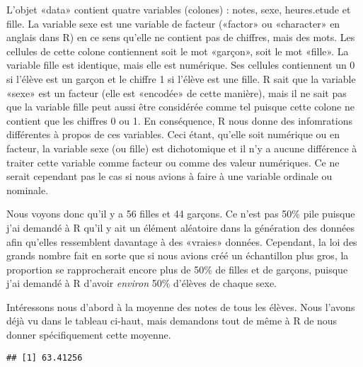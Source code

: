 \documentclass[
]{book}
\newenvironment{Shaded}{\begin{snugshade}}{\end{snugshade}}
\newcommand{\CommentTok}[1]{\textcolor[rgb]{0.56,0.35,0.01}{\textit{#1}}}
\newcommand{\FunctionTok}[1]{\textcolor[rgb]{0.00,0.00,0.00}{#1}}
\newcommand{\NormalTok}[1]{#1}
\newcommand{\SpecialCharTok}[1]{\textcolor[rgb]{0.00,0.00,0.00}{#1}}
\begin{document}
L'objet «data» contient quatre variables (colones) : notes, sexe, heures.etude et fille. La variable sexe est une variable de facteur («factor» ou «character» en anglais dans R) en ce sens qu'elle ne contient pas de chiffres, mais des mots. Les cellules de cette colone contiennent soit le mot «garçon», soit le mot «fille». La variable fille est identique, mais elle est numérique. Ses cellules contiennent un 0 si l'élève est un garçon et le chiffre 1 si l'élève est une fille. R sait que la variable «sexe» est un facteur (elle est «encodée» de cette manière), mais il ne sait pas que la variable fille peut aussi être considérée comme tel puisque cette colone ne contient que les chiffres 0 ou 1. En conséquence, R nous donne des infomrations différentes à propos de ces variables. Ceci étant, qu'elle soit numérique ou en facteur, la variable sexe (ou fille) est dichotomique et il n'y a aucune différence à traiter cette variable comme facteur ou comme des valeur numériques. Ce ne serait cependant pas le cas si nous avions à faire à une variable ordinale ou nominale.

Nous voyons donc qu'il y a 56 filles et 44 garçons. Ce n'est pas 50\% pile puisque j'ai demandé à R qu'il y ait un élément aléatoire dans la génération des données afin qu'elles ressemblent davantage à des «vraies» données. Cependant, la loi des grands nombre fait en sorte que si nous avions créé un échantillon plus gros, la proportion se rapprocherait encore plus de 50\% de filles et de garçons, puisque j'ai demandé à R d'avoir \emph{environ} 50\% d'élèves de chaque sexe.

Intéressons nous d'abord à la moyenne des notes de tous les élèves. Nous l'avons déjà vu dans le tableau ci-haut, mais demandons tout de même à R de nous donner spécifiquement cette moyenne.

\begin{Shaded}
\end{Shaded}

\begin{verbatim}
## [1] 63.41256
\end{verbatim}
\end{document}

